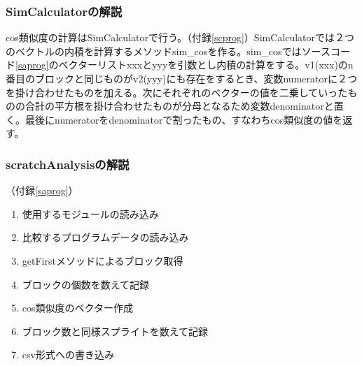 \documentclass[a4paper,10pt,onecolumn,oneside,openany]{jsbook}
\begin{document}
\subsubsection{SimCalculatorの解説}
cos類似度の計算はSimCalculatorで行う。（付録\ref{scprog}）SimCalculatorでは２つのベクトルの内積を計算するメソッドsim\_cosを作る。sim\_cosではソースコード\ref{saprog}のベクターリストxxxとyyyを引数とし内積の計算をする。v1(xxx)のn番目のブロックと同じものがv2(yyy)にも存在をするとき、変数numeratorに２つを掛け合わせたものを加える。次にそれぞれのベクターの値を二乗していったものの合計の平方根を掛け合わせたものが分母となるため変数denominatorと置く。最後にnumeratorをdenominatorで割ったもの、すなわちcos類似度の値を返す。

\subsubsection{scratchAnalysisの解説}（付録\ref{saprog}）
\begin{enumerate}
  \item 使用するモジュールの読み込み
  \item 比較するプログラムデータの読み込み
  \item getFirstメソッドによるブロック取得
  \item ブロックの個数を数えて記録
  \item cos類似度のベクター作成
  \item ブロック数と同様スプライトを数えて記録
  \item csv形式への書き込み
\end{enumerate}
\end{document}
